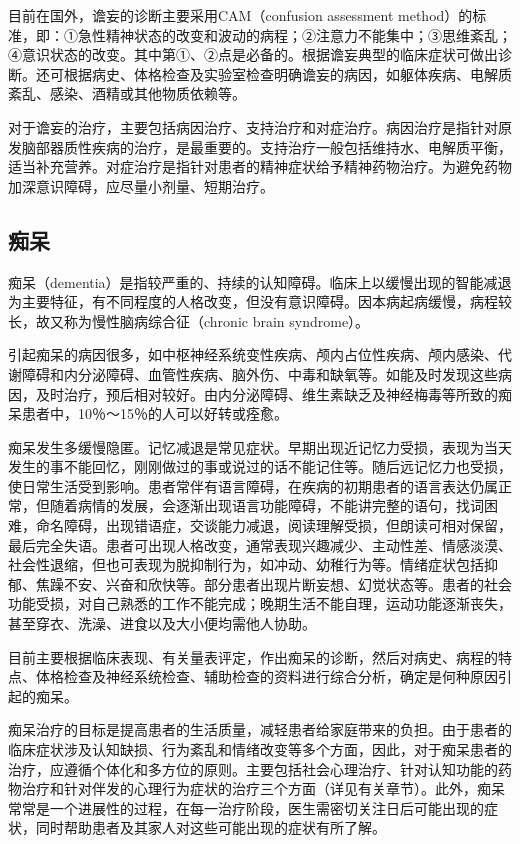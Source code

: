 目前在国外，谵妄的诊断主要采用CAM（confusion assessment
method）的标准，即：①急性精神状态的改变和波动的病程；②注意力不能集中；③思维紊乱；④意识状态的改变。其中第①、②点是必备的。根据谵妄典型的临床症状可做出诊断。还可根据病史、体格检查及实验室检查明确谵妄的病因，如躯体疾病、电解质紊乱、感染、酒精或其他物质依赖等。

对于谵妄的治疗，主要包括病因治疗、支持治疗和对症治疗。病因治疗是指针对原发脑部器质性疾病的治疗，是最重要的。支持治疗一般包括维持水、电解质平衡，适当补充营养。对症治疗是指针对患者的精神症状给予精神药物治疗。为避免药物加深意识障碍，应尽量小剂量、短期治疗。

\subsection{痴呆}

痴呆（dementia）是指较严重的、持续的认知障碍。临床上以缓慢出现的智能减退为主要特征，有不同程度的人格改变，但没有意识障碍。因本病起病缓慢，病程较长，故又称为慢性脑病综合征（chronic
brain syndrome）。

引起痴呆的病因很多，如中枢神经系统变性疾病、颅内占位性疾病、颅内感染、代谢障碍和内分泌障碍、血管性疾病、脑外伤、中毒和缺氧等。如能及时发现这些病因，及时治疗，预后相对较好。由内分泌障碍、维生素缺乏及神经梅毒等所致的痴呆患者中，10％～15％的人可以好转或痊愈。

痴呆发生多缓慢隐匿。记忆减退是常见症状。早期出现近记忆力受损，表现为当天发生的事不能回忆，刚刚做过的事或说过的话不能记住等。随后远记忆力也受损，使日常生活受到影响。患者常伴有语言障碍，在疾病的初期患者的语言表达仍属正常，但随着病情的发展，会逐渐出现语言功能障碍，不能讲完整的语句，找词困难，命名障碍，出现错语症，交谈能力减退，阅读理解受损，但朗读可相对保留，最后完全失语。患者可出现人格改变，通常表现兴趣减少、主动性差、情感淡漠、社会性退缩，但也可表现为脱抑制行为，如冲动、幼稚行为等。情绪症状包括抑郁、焦躁不安、兴奋和欣快等。部分患者出现片断妄想、幻觉状态等。患者的社会功能受损，对自己熟悉的工作不能完成；晚期生活不能自理，运动功能逐渐丧失，甚至穿衣、洗澡、进食以及大小便均需他人协助。

目前主要根据临床表现、有关量表评定，作出痴呆的诊断，然后对病史、病程的特点、体格检查及神经系统检查、辅助检查的资料进行综合分析，确定是何种原因引起的痴呆。

痴呆治疗的目标是提高患者的生活质量，减轻患者给家庭带来的负担。由于患者的临床症状涉及认知缺损、行为紊乱和情绪改变等多个方面，因此，对于痴呆患者的治疗，应遵循个体化和多方位的原则。主要包括社会心理治疗、针对认知功能的药物治疗和针对伴发的心理行为症状的治疗三个方面（详见有关章节）。此外，痴呆常常是一个进展性的过程，在每一治疗阶段，医生需密切关注日后可能出现的症状，同时帮助患者及其家人对这些可能出现的症状有所了解。

